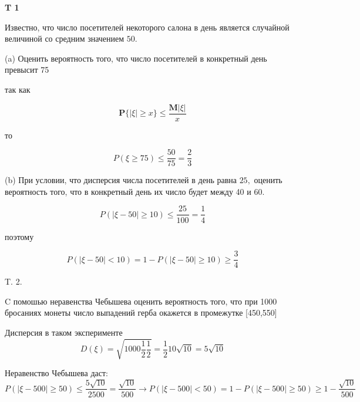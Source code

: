 \documentclass[a4paper,12pt]{article} %
\begin{document}
\begin{example}\textbf{T 1}

Известно, что число посетителей некоторого салона в день является случайной величиной со средним значением $50 .$

(a) Оценить вероятность того, что число посетителей в конкретный день превысит 75


так как

$$
\mathbf{P}\{|\xi| \geqslant x\} \leqslant \frac{\mathbf{M}|\xi|}{x}
$$

то


$$
P(\xi \geq 75) \leq \frac{50}{75}=\frac{2}{3}
$$



(b) При условии, что дисперсия числа посетителей в день равна $25,$ 
оценить вероятность того, что в конкретный день их число будет между 40 и $60 .$


$$
P(|\xi-50| \geq 10) \leq \frac{25}{100}=\frac{1}{4} 
$$

поэтому

\[  
P(|\xi-50|<10)=1-P(|\xi-50| \geq 10) \geq \frac{3}{4} 
\]




\end{example}



\begin{example} T. 2. 


$\mathrm{C}$ помошью неравенства Чебышева оценить вероятность того, что при 1000 бросаниях монеты число выпадений герба окажется в промежутке [450,550]





Дисперсия в таком эксперименте
$$
D(\xi)=\sqrt{1000 \frac{1}{2} \frac{1}{2}}=\frac{1}{2} 10 \sqrt{10}=5 \sqrt{10}
$$


Неравенство Чебышева даст:
$$
P(|\xi-500| \geq 50) \leq \frac{5 \sqrt{10}}{2500}=\frac{\sqrt{10}}{500} \rightarrow P(|\xi-500|<50)=1-P(|\xi-500| \geq 50) \geq 1-\frac{\sqrt{10}}{500}
$$






\end{example}
\end{document}
